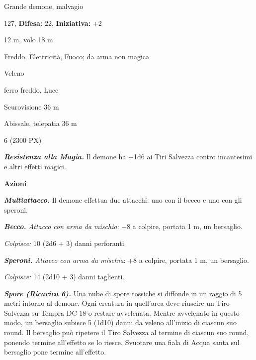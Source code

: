 \begin{multicols}{2}
{
\noindent
\begin{description}[noitemsep, topsep=0pt, parsep=0pt, partopsep=0pt, leftmargin=0cm, labelwidth=2.2cm]
	\item[\textbf{Taglia/Tipo:}] Grande demone, malvagio
	\item[\textbf{Caratt.:}] 
	\item[\textbf{Punti Ferita:}] 127,  \textbf{Difesa:} 22,  \textbf{Iniziativa:} +2
	\item[\textbf{Movimento:}] 12 m, volo 18 m
	\item[\textbf{Tiri Salvez.:}] 
	\item[\textbf{Res. Danni:}] Freddo, Elettricità, Fuoco; da arma non magica
	\item[\textbf{Imm. Danni:}] Veleno
	\item[\textbf{Vulnerabilità:}] ferro freddo, Luce
	\item[\textbf{Sensi:}] Scurovisione 36 m
	\item[\textbf{Linguaggi:}] Abissale, telepatia 36 m
	\item[\textbf{Sfida:}] 6 (2300 PX)\smallskip
\end{description}

\emph{\textbf{Resistenza alla Magia.}} Il demone ha +1d6 ai Tiri Salvezza contro incantesimi e altri effetti magici.

\textbf{Azioni}

\emph{\textbf{Multiattacco.}} Il demone effettua due attacchi: uno con il becco e uno con gli speroni.

\emph{\textbf{Becco.} Attacco con arma da mischia}: +8 a colpire, portata 1 m, un bersaglio.

\emph{Colpisce:} 10 (2d6 + 3) danni perforanti.

\emph{\textbf{Speroni.} Attacco con arma da mischia}: +8 a colpire, portata 1 m, un bersaglio.

\emph{Colpisce:} 14 (2d10 + 3) danni taglienti.

\emph{\textbf{Spore (Ricarica 6).}} Una nube di spore tossiche si diffonde in un raggio di 5 metri intorno al demone. Ogni creatura in quell'area deve riuscire un Tiro Salvezza su Tempra DC 18 o restare avvelenata. Mentre avvelenato in questo modo, un bersaglio subisce 5 (1d10) danni da veleno all'inizio di ciascun suo round. Il bersaglio può ripetere il Tiro Salvezza al termine di ciascun suo round, ponendo termine all'effetto se lo riesce. Svuotare una fiala di Acqua santa sul bersaglio pone termine all'effetto.

}
\end{multicols}
